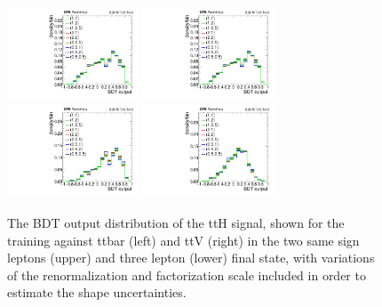 \begin{figure}[htb]
	\centering 
\includegraphics[width=0.35\textwidth]{plots_signal/theor_uncert/2lss/muR_muF_ttH/kinMVA_2lss_ttbar}
\includegraphics[width=0.35\textwidth]{plots_signal/theor_uncert/2lss/muR_muF_ttH/kinMVA_2lss_ttV}
\includegraphics[width=0.35\textwidth]{plots_signal/theor_uncert/3l/muR_muF_ttH/kinMVA_3l_ttbar}
\includegraphics[width=0.35\textwidth]{plots_signal/theor_uncert/3l/muR_muF_ttH/kinMVA_3l_ttV}
	\caption{The BDT output distribution of the ttH signal, shown for the training against ttbar 
	(left) and ttV (right) in the two same sign leptons (upper) and three lepton (lower) final state, 
	with variations of the renormalization and factorization scale included in order to estimate the 
	shape uncertainties.}
	\label{fig:ScaleonBDTshape}
\end{figure}

